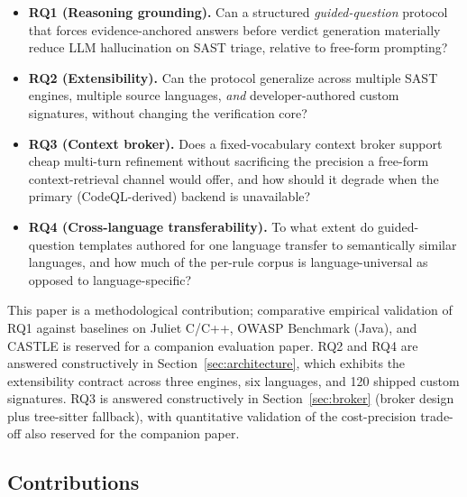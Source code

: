 \documentclass[11pt,a4paper]{article}
\begin{document}
\begin{itemize}[leftmargin=*]
\item \textbf{RQ1 (Reasoning grounding).} Can a structured
  \emph{guided-question} protocol that forces evidence-anchored answers
  before verdict generation materially reduce LLM hallucination on SAST
  triage, relative to free-form prompting?
\item \textbf{RQ2 (Extensibility).} Can the protocol generalize across
  multiple SAST engines, multiple source languages, \emph{and}
  developer-authored custom signatures, without changing the
  verification core?
\item \textbf{RQ3 (Context broker).} Does a fixed-vocabulary context
  broker support cheap multi-turn refinement without sacrificing the
  precision a free-form context-retrieval channel would offer, and
  how should it degrade when the primary (CodeQL-derived) backend is
  unavailable?
\item \textbf{RQ4 (Cross-language transferability).} To what extent do
  guided-question templates authored for one language transfer to
  semantically similar languages, and how much of the per-rule corpus
  is language-universal as opposed to language-specific?
\end{itemize}

This paper is a methodological contribution; comparative empirical
validation of RQ1 against baselines on Juliet C/C++, OWASP Benchmark
(Java), and CASTLE is reserved for a companion evaluation paper. RQ2
and RQ4 are answered constructively in
Section~\ref{sec:architecture}, which exhibits the extensibility
contract across three engines, six languages, and 120 shipped custom
signatures. RQ3 is answered constructively in Section~\ref{sec:broker}
(broker design plus tree-sitter fallback), with quantitative
validation of the cost-precision trade-off also reserved for the
companion paper.

\subsection{Contributions}
\label{sec:contributions}
\end{document}
